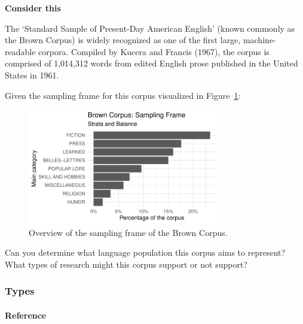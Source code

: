 \documentclass[
  letterpaper,
]{latex/krantz}
\let\oldparagraph\paragraph
\renewcommand{\paragraph}[1]{\oldparagraph{#1}\mbox{}}
\begin{document}
\begin{tcolorbox}[enhanced jigsaw, left=2mm, arc=.35mm, colback=white, rightrule=.15mm, toprule=.15mm, breakable, leftrule=.75mm, opacityback=0, bottomrule=.15mm]

\textbf{ Consider this}

The `Standard Sample of Present-Day American English' (known commonly as
the Brown Corpus) is widely recognized as one of the first large,
machine-readable corpora. Compiled by Kucera and Francis (1967), the
corpus is comprised of 1,014,312 words from edited English prose
published in the United States in 1961.

Given the sampling frame for this corpus visualized in
Figure~\ref{fig-brown-distribution}:

\begin{figure}[H]

{\centering \includegraphics[width=0.75\textwidth,height=\textheight]{understanding-data_files/figure-pdf/fig-brown-distribution-1.pdf}

}

\caption{\label{fig-brown-distribution}Overview of the sampling frame of
the Brown Corpus.}

\end{figure}

Can you determine what language population this corpus aims to
represent? What types of research might this corpus support or not
support?

\end{tcolorbox}

\hypertarget{types}{%
\subsubsection{Types}\label{types}}

\hypertarget{reference}{%
\paragraph{Reference}\label{reference}}
\end{document}

